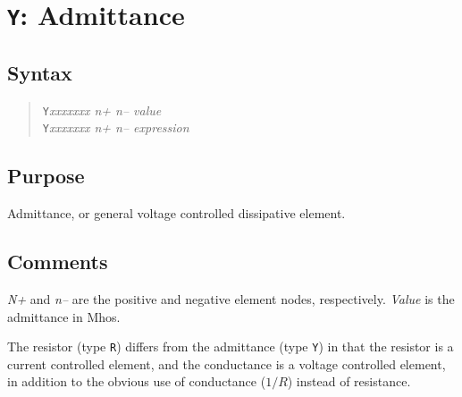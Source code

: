 \section{{\tt Y}: Admittance}
\subsection{Syntax}
\begin{verse}
{\tt Y}{\it xxxxxxx n+ n-- value}\\
{\tt Y}{\it xxxxxxx n+ n-- expression}
\end{verse}
\subsection{Purpose}

Admittance, or general voltage controlled dissipative element.
\subsection{Comments}

{\it N+} and {\it n--} are the positive and negative element nodes,
respectively.  {\it Value} is the admittance in Mhos.

The resistor (type {\tt R}) differs from the admittance (type {\tt Y}) in
that the resistor is a current controlled element, and the conductance is a
voltage controlled element, in addition to the obvious use of conductance
($1/R$) instead of resistance.
